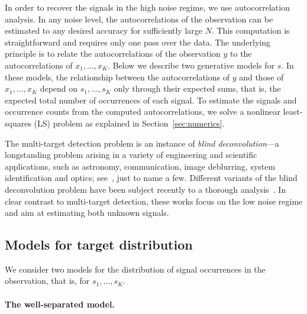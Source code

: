 \documentclass[12pt]{article}
\newcommand{\1}{\mathbf{1}}
\theoremstyle{plain}
\theoremstyle{definition}
\theoremstyle{remark}
\theoremstyle{plain}
\theoremstyle{remark}
\theoremstyle{plain}
\theoremstyle{plain}
\theoremstyle{plain}
\numberwithin{equation}{section}
\begin{document}
In order to recover the signals in the high noise regime, we use autocorrelation analysis.
In any noise level, the autocorrelations of the observation can be estimated to any desired accuracy for sufficiently large  $N$. 
This computation is straightforward and requires only one pass over the data.
The underlying principle is to relate the autocorrelations of the observation $y$ to the autocorrelations of $x_1,\ldots,x_K$.
Below we describe two generative models for $s$.  
In these models, the relationship between the autocorrelations of $y$ and those of $x_1,\ldots,x_K$ depend on $s_1,\ldots,s_K$ only through their expected sums, that is, the expected total number of occurrences of each signal.
To estimate the signals and occurrence counts from the computed autocorrelations, we solve a nonlinear least-squares (LS) problem as explained in Section~\ref{sec:numerics}. 

The multi-target detection problem  is an instance of  
\emph{blind deconvolution}---a longstanding problem arising in a variety of engineering and scientific applications, such as astronomy, communication, image deblurring, system identification and optics; see~\cite{jefferies1993restoration,shalvi1990new,ayers1988iterative,abed1997blind}, just to name a few. 
Different variants of the blind deconvolution problem have been subject recently to a thorough  analysis~\cite{ahmed2014blind,li2016identifiability,li2016rapid,lee2017blind,ling2017blind,kuo2019geometry}. In clear contrast to multi-target detection, these works focus on the low noise regime and aim at estimating both unknown signals.

\subsection*{Models for target distribution}

We consider two  models for the distribution of signal occurrences in the observation, that is, for $s_1, \ldots, s_K$.

\paragraph{The well-separated model.}
\end{document}
